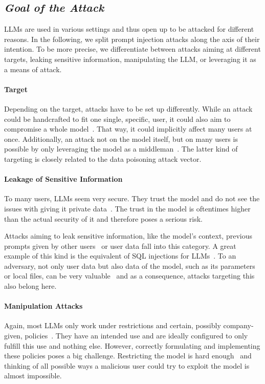 \subsection{\textit{Goal of the Attack}}
LLMs are used in various settings and thus open up to be attacked for different reasons.
In the following, we split prompt injection attacks along the axis of their intention. 
To be more precise, we differentiate between attacks aiming at different targets, leaking sensitive information, manipulating the LLM, or leveraging it as a means of attack.
\paragraph{Target}
Depending on the target, attacks have to be set up differently.
While an attack could be handcrafted to fit one single, specific, user, it could also aim to compromise a whole model~\cite{pedro2023prompt}. 
That way, it could implicitly affect many users at once. 
Additionally, an attack not on the model itself, but on many users is possible by only leveraging the model as a middleman~\cite{10.1145/3605764.3623985}. 
The latter kind of targeting is closely related to the data poisoning attack vector. 
\paragraph{Leakage of Sensitive Information}
To many users, LLMs seem very secure. 
They trust the model and do not see the issues with giving it private data~\cite{Overreliance}. 
The trust in the model is oftentimes higher than the actual security of it and therefore poses a serious risk. 

Attacks aiming to leak sensitive information, like the model's context, previous prompts given by other users~\cite{zhang2023prompts} or user data fall into this category. 
A great example of this kind is the equivalent of SQL injections for LLMs~\cite{pedro2023prompt, zhang-etal-2023-trojansql}. 
To an adversary, not only user data but also data of the model, such as its parameters or local files, can be very valuable~\cite{yu2023assessing} and as a consequence, attacks targeting this also belong here.
\paragraph{Manipulation Attacks}
Again, most LLMs only work under restrictions and certain, possibly company-given, policies~\cite{pedro2023prompt, iqbal2023llm}.
They have an intended use and are ideally configured to only fulfill this use and nothing else.
However, correctly formulating and implementing these policies poses a big challenge. 
Restricting the model is hard enough~\cite{iqbal2023llm} and thinking of all possible ways a malicious user could try to exploit the model is almost impossible. 

